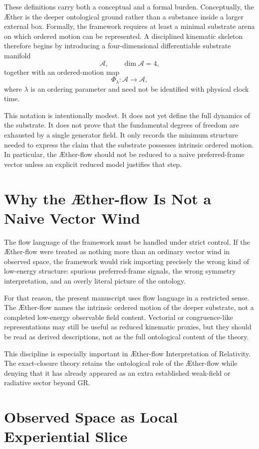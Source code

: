 \documentclass[11pt]{article}
\newcommand{\Aether}{\AE{}ther}
\newcommand{\Aflow}{\AE{}ther-flow}
\newcommand{\TheoryName}{\Aflow{} Interpretation of Relativity}
\newcommand{\Sub}{\mathcal{A}}
\begin{document}
These definitions carry both a conceptual and a formal burden. Conceptually, the \Aether{} is the deeper ontological ground rather than a substance inside a larger external box. Formally, the framework requires at least a minimal substrate arena on which ordered motion can be represented. A disciplined kinematic skeleton therefore begins by introducing a four-dimensional differentiable substrate manifold
\[
\Sub,
\qquad
\dim \Sub = 4,
\]
together with an ordered-motion map
\[
\Phi_{\lambda}:\Sub \to \Sub,
\]
where \(\lambda\) is an ordering parameter and need not be identified with physical clock time.

This notation is intentionally modest. It does not yet define the full dynamics of the substrate. It does not prove that the fundamental degrees of freedom are exhausted by a single generator field. It only records the minimum structure needed to express the claim that the substrate possesses intrinsic ordered motion. In particular, the \Aflow{} should not be reduced to a naive preferred-frame vector unless an explicit reduced model justifies that step.

\section{Why the \Aflow{} Is Not a Naive Vector Wind}

The flow language of the framework must be handled under strict control. If the \Aflow{} were treated as nothing more than an ordinary vector wind in observed space, the framework would risk importing precisely the wrong kind of low-energy structure: spurious preferred-frame signals, the wrong symmetry interpretation, and an overly literal picture of the ontology.

For that reason, the present manuscript uses flow language in a restricted sense. The \Aflow{} names the intrinsic ordered motion of the deeper substrate, not a completed low-energy observable field content. Vectorial or congruence-like representations may still be useful as reduced kinematic proxies, but they should be read as derived descriptions, not as the full ontological content of the theory.

This discipline is especially important in \TheoryName{}. The exact-closure theory retains the ontological role of the \Aflow{} while denying that it has already appeared as an extra established weak-field or radiative sector beyond GR.

\section{Observed Space as Local Experiential Slice}
\end{document}
